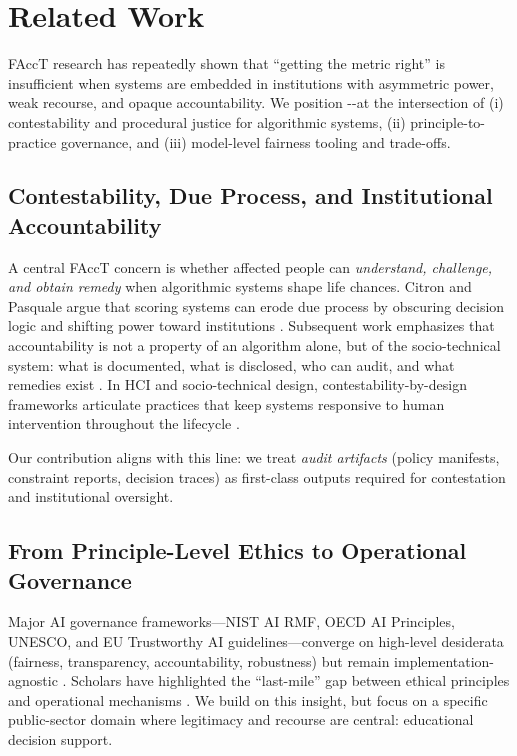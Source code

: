 \section{Related Work}
\label{sec:related}

FAccT research has repeatedly shown that ``getting the metric right'' is insufficient when systems are embedded in institutions with asymmetric power, weak recourse, and opaque accountability.
We position \compa-\ecl-\mas at the intersection of (i) contestability and procedural justice for algorithmic systems, (ii) principle-to-practice governance, and (iii) model-level fairness tooling and trade-offs.



\subsection{Contestability, Due Process, and Institutional Accountability}
A central FAccT concern is whether affected people can \emph{understand, challenge, and obtain remedy} when algorithmic systems shape life chances.
Citron and Pasquale argue that scoring systems can erode due process by obscuring decision logic and shifting power toward institutions \cite{CitronPasquale2014ScoredSociety}.
Subsequent work emphasizes that accountability is not a property of an algorithm alone, but of the socio-technical system: what is documented, what is disclosed, who can audit, and what remedies exist \cite{Wieringa2020AccountFor,Metcalf2021AIA,Selbst2019Abstraction}.
In HCI and socio-technical design, contestability-by-design frameworks articulate practices that keep systems responsive to human intervention throughout the lifecycle \cite{Alfrink2023ContestableAI}.

Our contribution aligns with this line: we treat \emph{audit artifacts} (policy manifests, constraint reports, decision traces) as first-class outputs required for contestation and institutional oversight.

\subsection{From Principle-Level Ethics to Operational Governance}
Major AI governance frameworks---NIST AI RMF, OECD AI Principles, UNESCO, and EU Trustworthy AI guidelines---converge on high-level desiderata (fairness, transparency, accountability, robustness) but remain implementation-agnostic \cite{NISTAIRMF2023,OECD2019AI,UNESCO2021AI,EUHLEG2019Trustworthy}.
Scholars have highlighted the ``last-mile'' gap between ethical principles and operational mechanisms \cite{Dignum2018EthicsSpecialIssue,Mittelstadt2019Principles}.
We build on this insight, but focus on a specific public-sector domain where legitimacy and recourse are central: educational decision support.

